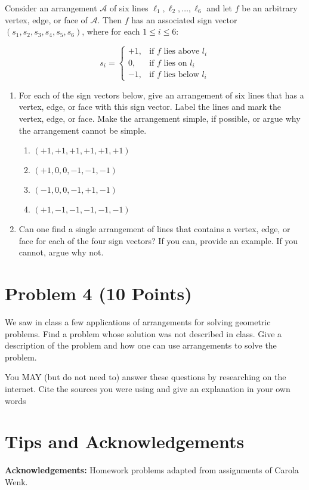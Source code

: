 \documentclass[11pt]{article}
\newcommand{\A}{{\mathcal{A}}}
\begin{document}
Consider an arrangement $\A$ of six lines $\ell_1, \ell_2, \ldots, \ell_6$ and
let $f$ be an arbitrary vertex, edge, or face of $\A$. Then $f$ has an
associated sign vector $(s_1, s_2, s_3, s_4, s_5, s_6)$, where for each $1 \le i
\le 6$:

$$
    s_i =
    \begin{cases}
        +1, & \text{if $f$ lies above $l_i$} \\
        0,  & \text{if $f$ lies on $l_i$} \\
        -1, & \text{if $f$ lies below $l_i$}
    \end{cases}
$$

\begin{enumerate}

    \item For each of the sign vectors below, give an arrangement of six lines
        that has a vertex, edge, or face with this sign vector. Label the lines
        and mark the vertex, edge, or face. Make the arrangement simple, if
        possible, or argue why the arrangement cannot be simple.
        \begin{enumerate}
            \item $(+1, +1, +1, +1, +1, +1)$
            \item $(+1, 0, 0, -1, -1, -1)$
            \item $(-1, 0, 0, -1, +1, -1)$
            \item $(+1, -1, -1, -1, -1, -1)$
        \end{enumerate}

    \item Can one find a single arrangement of lines that contains a vertex,
        edge, or face for each of the four sign vectors? If you can, provide an
        example.  If you cannot, argue why not.

\end{enumerate}


\section*{Problem 4 (10 Points)}

We saw in class a few applications of arrangements for solving geometric
problems. Find a problem whose solution was not described in class.  Give a
description of the problem and how one can use arrangements to solve the
problem.

You MAY (but do not need to) answer these questions by researching on the
internet. Cite the sources you were using and give an explanation in your own
words

\section*{Tips and Acknowledgements}

{\bf Acknowledgements:} Homework problems adapted from assignments of Carola
Wenk.
\end{document}
